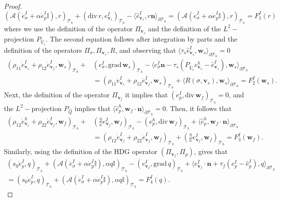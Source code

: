 \documentclass[10pt,letterpaper]{amsart}
\theoremstyle{plain} %
\theoremstyle{remark} %
\newcommand{\vect}[1]{\mathbf{#1}}
\newcommand{\divergence}{\mathrm{div}\,}
\newcommand{\grad}{\mathrm{grad}\,}
\newcommand{\Id}{\mathbb{I}} %
\newcommand{\Ael}{\mathcal{A}} %
\newcommand{\Thprod}[2]{( #1, #2 )_{\mathcal{T}_h}}
\newcommand{\pThprod}[2]{\langle #1, #2 \rangle_{\partial \mathcal{T}_{h}}}
\begin{document}
\begin{proof}
	\[
	\Thprod{\Ael(\dot{e}_{\sigma}^{I} + \alpha \dot{e}_{p}^{I} \Id)}{r} +\Thprod{\divergence r}{e_{\vect{v}_{s}}^{I}} -\pThprod{\widehat{e}_{\vect{v}_{s}}^{I}}{r \vect{n}} = \Thprod{\Ael(\dot{e}_{\sigma}^{I} + \alpha \dot{e}_{p}^{I} \Id)}{r} = F_{1}^{I}(r)
	\]
	where we use the definition of the operator $\Pi_{\vect{v}_s}$ and the definition of the $L^{2}-$projection $P_{\widehat{V}_s}$.
	The second equation follows after integration by parts and the definition of the operators $\Pi_{\sigma}, \Pi_{\vect{v}_s}, R$, and observing that $\pThprod{\tau_{s}\widehat{e}_{\vect{v}_s}^{I}}{\vect{w}_s} = 0$
	\begin{align*}
		\Thprod{\rho_{11}\dot{e}_{\vect{v}_{s}}^{I}+\rho_{12}\dot{e}_{\vect{v}_{f}}^{I}}{\vect{w}_{s}} + &\Thprod{e_{\sigma}^{I}}{\grad \vect{w}_{s}} - \pThprod{e_{\sigma}^{I} \vect{n} - \tau_{s} ({P_{\widehat{V}_s}}{e}_{\vect{v}_{s}}^{h} - \widehat{e}_{\vect{v}_{s}}^{I})}{\vect{w}_{s}} \\
		&=\Thprod{\rho_{11}\dot{e}_{\vect{v}_{s}}^{I}+\rho_{12}\dot{e}_{\vect{v}_{f}}^{I}}{\vect{w}_{s}} + 
		\pThprod{R(\sigma, \vect{v}_s)}{\vect{w}_s} = F^{I}_2(\vect{w}_s).
	\end{align*}
	Next, the definition of the operator $\Pi_{\vect{v}_f}$ it implies that $\Thprod{e_{p}^{I}}{\divergence \vect{w}_f} = 0$, and the $L^2-$projection $P_{\widehat{Q}}$ implies that  $\pThprod{\widehat{e}_{p}^{h}}{\vect{w}_{f}\cdot\vect{n}}=0 $. Then, it follows that
	\begin{align*}
		\Thprod{\rho_{12}\dot{e}_{\vect{v}_{s}}^{h}+\rho_{22}\dot{e}_{\vect{v}_{f}}^{I}}{\vect{w}_{f}} + &\Thprod{\frac{\eta}{\kappa} e_{\vect{v}_{f}}^{I}}{\vect{w}_{f}} - \Thprod{e_{p}^{h} }{\divergence\vect{w}_{f}} +\pThprod{\widehat{e}_{p}^{h}}{\vect{w}_{f}\cdot\vect{n}}  \\ 
		&= \Thprod{\rho_{12}\dot{e}_{\vect{v}_{f}}^{I}+\rho_{22}\dot{e}_{\vect{v}_{f}}^{I}}{\vect{w}_{f}} + \Thprod{\frac{\eta}{\kappa} e_{\vect{v}_{f}}^{I}}{\vect{w}_{f}} = F_{3}^{I}(\vect{w}_{f}).
	\end{align*}
	Similarly, using the definition of the HDG operator $(\Pi_{\vect{v}_{f}}, \Pi_{p})$, gives that
	\begin{multline*}
		\Thprod{s_{0}\dot{e}_{p}^{I}}{q} + \Thprod{\Ael(\dot{e}_{\sigma}^{I}+\alpha \dot{e}_{p}^{I}\Id)}{\alpha q\Id} - \Thprod{e_{\vect{v}_{f}}^{I}}{\grad q} + \pThprod{e_{\vect{v}_{f}}^{I}\cdot \vect{n} + \tau_f (e_p^{I} - \hat{e}_p^{I})}{q} 
        \\ 
		=  \Thprod{s_{0}\dot{e}_{p}^{I}}{q} + \Thprod{\Ael(\dot{e}_{\sigma}^{I}+\alpha \dot{e}_{p}^{I}\Id)}{\alpha q\Id}   = F_{4}^{I}(q).

\end{multline*}
\end{proof}
\end{document}
